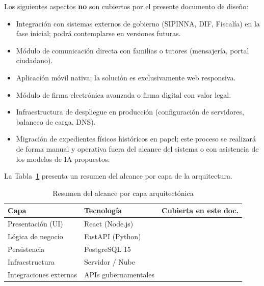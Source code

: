 Los siguientes aspectos \textbf{no} son cubiertos por el presente documento de diseño:

\begin{itemize}
	\item Integración con sistemas externos de gobierno (SIPINNA, DIF, Fiscalía) en la
	fase inicial; podrá contemplarse en versiones futuras.
	\item Módulo de comunicación directa con familias o tutores (mensajería, portal
	ciudadano).
	\item Aplicación móvil nativa; la solución es exclusivamente web responsiva.
	\item Módulo de firma electrónica avanzada o firma digital con valor legal.
	\item Infraestructura de despliegue en producción (configuración de servidores,
	balanceo de carga, DNS).
	\item Migración de expedientes físicos históricos en papel; este proceso se realizará
	de forma manual y operativa fuera del alcance del sistema o con asistencia de los modelos de IA propuestos.
\end{itemize}

\bigskip
\noindent

La Tabla~\ref{tab:alcance-resumen} presenta un resumen del alcance por capa de la
arquitectura.

\begin{table}[h!]
	\centering
	\caption{Resumen del alcance por capa arquitectónica}
	\begin{tabular}{|l|l|c|}
		\hline
		\textbf{Capa}         & \textbf{Tecnología}         & \textbf{Cubierta en este doc.} \\ \hline
		Presentación (UI)     & React (Node.js)             & \checkmark                     \\ \hline
		Lógica de negocio     & FastAPI (Python)            & \checkmark                     \\ \hline
		Persistencia          & PostgreSQL 15               & \checkmark                     \\ \hline
		Infraestructura       & Servidor / Nube             & \texttimes                     \\ \hline
		Integraciones externas & APIs gubernamentales       & \texttimes                     \\ \hline
	\end{tabular}
	\label{tab:alcance-resumen}
\end{table}